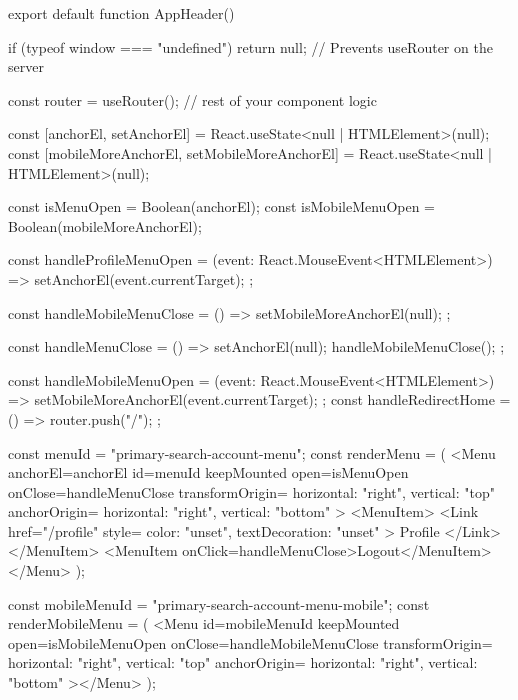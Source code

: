 export default function AppHeader() {
  if (typeof window === "undefined") return null; // Prevents useRouter on the server

  const router = useRouter();
  // rest of your component logic

  const [anchorEl, setAnchorEl] = React.useState<null | HTMLElement>(null);
  const [mobileMoreAnchorEl, setMobileMoreAnchorEl] =
    React.useState<null | HTMLElement>(null);

  const isMenuOpen = Boolean(anchorEl);
  const isMobileMenuOpen = Boolean(mobileMoreAnchorEl);

  const handleProfileMenuOpen = (event: React.MouseEvent<HTMLElement>) => {
    setAnchorEl(event.currentTarget);
  };

  const handleMobileMenuClose = () => {
    setMobileMoreAnchorEl(null);
  };

  const handleMenuClose = () => {
    setAnchorEl(null);
    handleMobileMenuClose();
  };

  const handleMobileMenuOpen = (event: React.MouseEvent<HTMLElement>) => {
    setMobileMoreAnchorEl(event.currentTarget);
  };
  const handleRedirectHome = () => {
    router.push("/");
  };

  const menuId = "primary-search-account-menu";
  const renderMenu = (
    <Menu
      anchorEl={anchorEl}
      id={menuId}
      keepMounted
      open={isMenuOpen}
      onClose={handleMenuClose}
      transformOrigin={{ horizontal: "right", vertical: "top" }}
      anchorOrigin={{ horizontal: "right", vertical: "bottom" }}
    >
      <MenuItem>
        <Link
          href={"/profile"}
          style={{ color: "unset", textDecoration: "unset" }}
        >
          Profile
        </Link>
      </MenuItem>
      <MenuItem onClick={handleMenuClose}>Logout</MenuItem>
    </Menu>
  );

  const mobileMenuId = "primary-search-account-menu-mobile";
  const renderMobileMenu = (
    <Menu
      id={mobileMenuId}
      keepMounted
      open={isMobileMenuOpen}
      onClose={handleMobileMenuClose}
      transformOrigin={{ horizontal: "right", vertical: "top" }}
      anchorOrigin={{ horizontal: "right", vertical: "bottom" }}
    ></Menu>
  );

}
